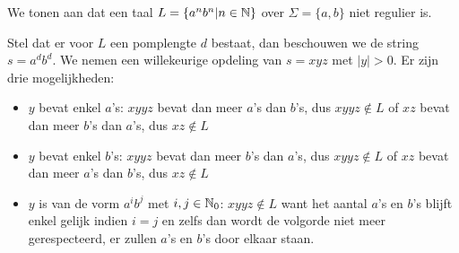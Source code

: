 We tonen aan dat een taal $L = \{a^nb^n|n \in \mathbb{N}\}$ over $\Sigma = \{a,b\}$ niet regulier is.

Stel dat er voor $L$ een pomplengte $d$ bestaat, dan beschouwen we de string $s=a^db^d$. We nemen een willekeurige opdeling van $s=xyz$ met $|y| > 0$. Er zijn drie mogelijkheden:

\begin{itemize}
\item $y$ bevat enkel $a$'s: $xyyz$ bevat dan meer $a$'s dan $b$'s, dus $xyyz \notin L$ of $xz$ bevat dan meer $b$'s dan $a$'s, dus $xz \notin L$
\item $y$ bevat enkel $b$'s: $xyyz$ bevat dan meer $b$'s dan $a$'s, dus $xyyz \notin L$ of $xz$ bevat dan meer $a$'s dan $b$'s, dus $xz \notin L$
\item $y$ is van de vorm $a^ib^j$ met $i,j \in \mathbb{N}_0$: $xyyz \notin L$ want het aantal $a$'s en $b$'s blijft enkel gelijk indien $i=j$ en zelfs dan wordt de volgorde niet meer gerespecteerd, er zullen $a$'s en $b$'s door elkaar staan.
\end{itemize}